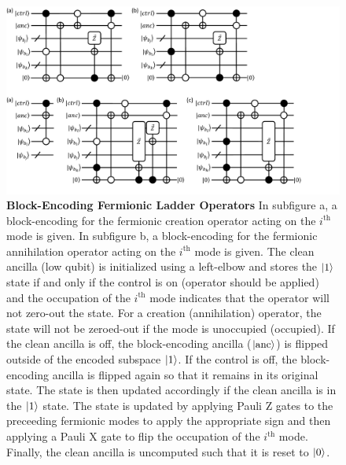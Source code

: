 \begin{figure}[h]
    \includegraphics[width=12cm]{figures/fermionic-be.pdf}
    \caption{
        \textbf{Block-Encoding Fermionic Ladder Operators}
        In subfigure a, a block-encoding for the fermionic creation operator acting on the $i^\text{th}$ mode is given.
        In subfigure b, a block-encoding for the fermionic annihilation operator acting on the $i^\text{th}$ mode is given.
        The clean ancilla (low qubit) is initialized using a left-elbow and stores the $\ket{1}$ state if and only if the control is on (operator should be applied) and the occupation of the $i^\text{th}$ mode indicates that the operator will not zero-out the state.
        For a creation (annihilation) operator, the state will not be zeroed-out if the mode is unoccupied (occupied).
        If the clean ancilla is off, the block-encoding ancilla ($\ket{\text{anc}}$) is flipped outside of the encoded subspace $\ket{1}$.
        If the control is off, the block-encoding ancilla is flipped again so that it remains in its original state.
        The state is then updated accordingly if the clean ancilla is in the $\ket{1}$ state.
        The state is updated by applying Pauli Z gates to the preceeding fermionic modes to apply the appropriate sign and then applying a Pauli X gate to flip the occupation of the $i^\text{th}$ mode.
        Finally, the clean ancilla is uncomputed such that it is reset to $\ket{0}$.
    }
    \label{fig:fermionic-be}
\end{figure}


